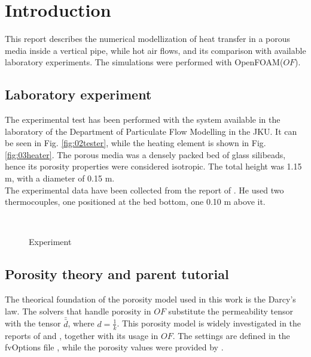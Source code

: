 
\section{Introduction}
\label{section:introduction}

This report describes the numerical modellization of heat transfer in a porous
media inside a vertical pipe, while hot air flows, and its comparison with available laboratory
experiments. The simulations were performed with OpenFOAM\textregistered ($OF$).

\subsection{Laboratory experiment}
\label{subsection:laboratoryexperiment}

The experimental test has been performed with the system available in the
laboratory of the Department of Particulate Flow Modelling in the JKU.
It can be seen in Fig. \ref{fig:02tester}, while the heating element is shown in
Fig. \ref{fig:03heater}. 
The porous media was a densely packed bed of glass silibeads, 
hence its porosity properties were considered isotropic.
The total height was
1.15 m, with a diameter of 0.15 m. \\
The experimental data have been collected from the report of
\textcite{ReportHofer}.
He used two thermocouples, one positioned at the bed bottom, one 0.10
m above it.

\begin{figure}[!h]
\centering
{} \quad  %
{} \\  
\caption[Experiment]{Experiment}
\label{fig:experiments}
\end{figure}

\subsection{Porosity theory and parent tutorial}
\label{subsection:porositytheorytutorial}

The theorical foundation of the porosity model used in this work is the
Darcy's law.
The solvers that handle porosity in $OF$ substitute the
permeability tensor with the tensor $\bar{\bar{d}}$, where $d= \frac {1}{k}$.
This porosity model is widely investigated in the reports of
\textcite{ReportReveillon} and \textcite{Soulaine}, together with its usage in
$OF$.
The settings are defined in the fvOptions file \cite{OForgFv},
while the porosity values were provided by \textcite{Permeability}.



